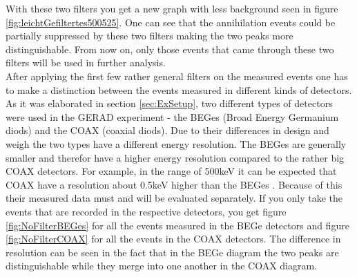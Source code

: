 With these two filters you get a new graph with less background seen in figure \ref{fig:leichtGefiltertes500525}.
One can see that the annihilation events could be partially suppressed by these two filters making the two peaks more distinguishable.
From now on, only those events that came through these two filters will be used in further analysis.
\\

After applying the first few rather general filters on the measured events one has to make a distinction between the events measured in different kinds of detectors.
As it was elaborated in section \ref{sec:ExSetup}, two different types of detectors were used in the GERAD experiment - the BEGes (Broad Energy Germanium diods) and the COAX (coaxial diods). 
Due to their differences in design and weigh the two types have a different energy resolution. 
The BEGes are generally smaller and therefor have a higher energy resolution compared to the rather big COAX detectors.
For example, in the range of 500keV it can be expected that COAX have a resolution about 0.5keV higher than the BEGes \cite{2017Natur.544...47A}. 
Because of this their measured data must and will be evaluated separately. 
If you only take the events that are recorded in the respective detectors, you get figure \ref{fig:NoFilterBEGes} for all the events measured in the BEGe detectors and figure \ref{fig:NoFilterCOAX} for all the events in the COAX detectors.
The difference in resolution can be seen in the fact that in the BEGe diagram the two peaks are distinguishable while they merge into one another in the COAX diagram.  
\\

